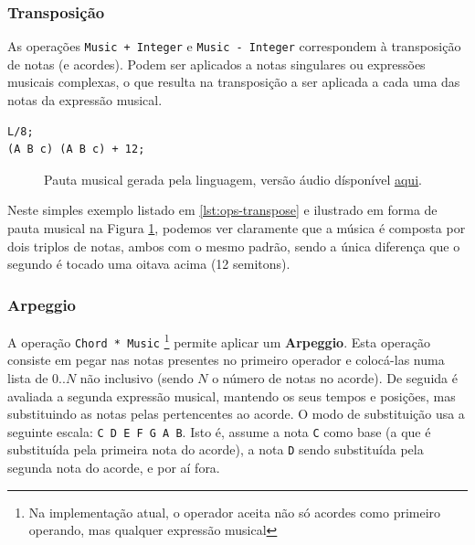 \subsubsection{Transposição}
As operações \verb|Music + Integer| e \verb|Music - Integer| correspondem à transposição de notas (e acordes). Podem ser aplicados a notas singulares ou expressões musicais complexas, o que resulta na transposição a ser aplicada a cada uma das notas da expressão musical.

\begin{lstlisting}[caption={Exemplo de transposição de um acompanhamento com três notas},label=lst:ops-transpose,belowcaptionskip=-\medskipamount]
L/8;
(A B c) (A B c) + 12;
\end{lstlisting}

\begin{figure}[ht]
  \centering
  {%
  \setlength{\fboxsep}{0pt}%
  \setlength{\fboxrule}{0pt}%
  }%
  \caption{Pauta musical gerada pela linguagem, versão áudio dísponível \href{https://drive.google.com/file/d/1xVey6on6Q-sWjNgo__Llb3QgOF1-_axa}{\underline{aqui}}\protect\footnotemark.}
  \label{fig:ops-transpose}
\end{figure}

Neste simples exemplo listado em \ref{lst:ops-transpose} e ilustrado em forma de pauta musical na Figura \ref{fig:ops-transpose}, podemos ver claramente que a música é composta por dois triplos de notas, ambos com o mesmo padrão, sendo a única diferença que o segundo é tocado uma oitava acima (12 semitons).

\subsubsection{Arpeggio}
A operação \verb|Chord * Music| \footnote{Na implementação atual, o operador aceita não só acordes como primeiro operando, mas qualquer expressão musical} permite aplicar um \textbf{Arpeggio}. Esta operação consiste em pegar nas notas presentes no primeiro operador e colocá-las numa lista de $0 .. N$ não inclusivo (sendo $N$ o número de notas no acorde). De seguida é avaliada a segunda expressão musical, mantendo os seus tempos e posições, mas substituindo as notas pelas pertencentes ao acorde. O modo de substituição usa a seguinte escala: \texttt{C D E F G A B}. Isto é, assume a nota \texttt{C} como base (a que é substituída pela primeira nota do acorde), a nota \texttt{D} sendo substituída pela segunda nota do acorde, e por aí fora.

